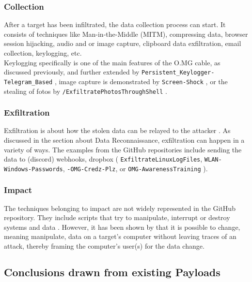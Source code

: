 \subsubsection{Collection}
After a target has been infiltrated, the data collection process can start. It consists of techniques like Man-in-the-Middle (MITM), compressing data, browser session hijacking, audio and or image capture, clipboard data exfiltration, email collection, keylogging, etc. \cite{MITREATTCK} \\
Keylogging specifically is one of the main features of the O.MG cable, as discussed previously, and further extended by \verb|Persistent_Keylogger-Telegram_Based|  \cite{OmgpayloadsPayloadsLibrary}, image capture is demonstrated by \verb|Screen-Shock| \cite{OmgpayloadsPayloadsLibrary}, or the stealing of fotos by \verb|/ExfiltratePhotosThroughShell| \cite{OmgpayloadsPayloadsLibrary}. 


\subsubsection{Exfiltration}

Exfiltration is about how the stolen data can be relayed to the attacker \cite{MITREATTCK}. As discussed in the section about Data Reconnaissance, exfiltration can happen in a variety of ways. The examples from the GitHub repositories include sending the data to (discord) webhooks, dropbox  ( \verb|ExfiltrateLinuxLogFiles|, \verb|WLAN-Windows-Passwords|, \verb|-OMG-Credz-Plz|, or \verb|OMG-AwarenessTraining|  \cite{OmgpayloadsPayloadsLibrary}).

\subsubsection{Impact}

The techniques belonging to impact are not widely represented in the GitHub repository. They include scripts that try to manipulate, interrupt or destroy systems and data \cite{MITREATTCK}. However, it has been shown by \cite{lawalFacilitatingCyberenabledFraud2022} that it is possible to change, meaning manipulate, data on a target's computer without leaving traces of an attack, thereby framing the computer's user(s) for the data change. 

\subsection{Conclusions drawn from existing Payloads}

